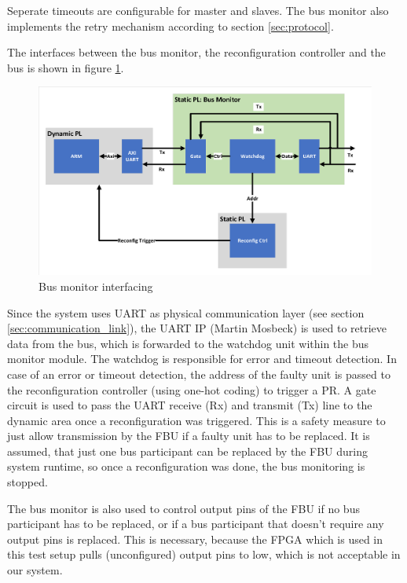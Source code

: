 Seperate timeouts are configurable for master and slaves. The bus monitor also implements the retry mechanism according to section \ref{sec:protocol}.

The interfaces between the bus monitor, the reconfiguration controller and the bus is shown in figure \ref{fig:BusMonitor}.

\begin{figure}[h!]
    \centering
    \includegraphics[width=\textwidth]{figures/BusMonitor.pdf}
    \caption{Bus monitor interfacing}\label{fig:BusMonitor}
\end{figure}

Since the system uses UART as physical communication layer (see section \ref{sec:communication_link}), the UART IP (Martin Mosbeck) is used to retrieve data from the bus, which is forwarded to the watchdog unit within the bus monitor module. The watchdog is responsible for error and timeout detection. 
In case of an error or timeout detection, the address of the faulty unit is passed to the reconfiguration controller (using one-hot coding) to trigger a \gls{PR}. 
A gate circuit is used to pass the \gls{UART} receive (Rx) and transmit (Tx) line to the dynamic area once a reconfiguration was triggered. This is a safety measure to just allow transmission by the \gls{FBU} if a faulty unit has to be replaced. 
It is assumed, that just one bus participant can be replaced by the \gls{FBU} during system runtime, so once a reconfiguration was done, the bus monitoring is stopped.

The bus monitor is also used to control output pins of the \gls{FBU} if no bus participant has to be replaced, or if a bus participant that doesn't require any output pins is replaced. 
This is necessary, because the \gls{FPGA} which is used in this test setup pulls (unconfigured) output pins to low, which is not acceptable in our system.
